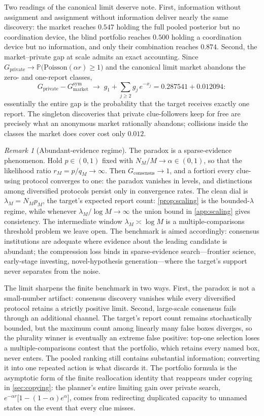 \documentclass[11pt]{article}
\theoremstyle{definition}
\theoremstyle{remark}
\newtheorem{remark}{Remark}
\newcommand{\Prob}{\mathbb{P}}
\newcommand{\1}{\mathbf{1}}
\newcommand{\priv}{\mathrm{private}}
\newcommand{\cons}{\mathrm{consensus}}
\newcommand{\mkt}{\mathrm{market}}
\begin{document}
Two readings of the canonical limit deserve note. First, information without assignment and assignment without information deliver nearly the same discovery: the market reaches $0.547$ holding the full pooled posterior but no coordination device, the blind portfolio reaches $0.500$ holding a coordination device but no information, and only their combination reaches $0.874$. Second, the market--private gap at scale admits an exact accounting. Since $G_{\priv}\to\Prob\bigl(\mathrm{Poisson}(\alpha r)\ge1\bigr)$ and the canonical limit market abandons the zero- and one-report classes,
\[
G_{\priv}-G_{\mkt}^{\mathrm{sym}}
\;\longrightarrow\;
g_1+\sum_{j\ge2}g_j\,e^{-x_j}
=0.287541+0.012094:
\]
essentially the entire gap is the probability that the target receives exactly one report. The singleton discoveries that private clue-followers keep for free are precisely what an anonymous market rationally abandons; collisions inside the classes the market does cover cost only $0.012$.

\begin{remark}[Abundant-evidence regime]
\label{rem:abundant}
The paradox is a sparse-evidence phenomenon. Hold $p\in(0,1)$ fixed with $N_M/M\to\alpha\in(0,1)$, so that the likelihood ratio $r_M=p/q_M\to\infty$. Then $G_{\cons}\to1$, and a fortiori every clue-using protocol converges to one: the paradox vanishes in levels, and distinctions among diversified protocols persist only in convergence rates. The clean dial is $\lambda_M=N_Mp_M$, the target's expected report count: \cref{prop:scaling} is the bounded-$\lambda$ regime, while whenever $\lambda_M/\log M\to\infty$ the union bound in \cref{app:scaling} gives consistency. The intermediate window $\lambda_M\asymp\log M$ is a multiple-comparisons threshold problem we leave open. The benchmark is aimed accordingly: consensus institutions are adequate where evidence about the leading candidate is abundant; the compression loss binds in sparse-evidence search---frontier science, early-stage investing, novel-hypothesis generation---where the target's support never separates from the noise.
\end{remark}

The limit sharpens the finite benchmark in two ways. First, the paradox is not a small-number artifact: consensus discovery vanishes while every diversified protocol retains a strictly positive limit. Second, large-scale consensus fails through an additional channel. The target's report count remains stochastically bounded, but the maximum count among linearly many false boxes diverges, so the plurality winner is eventually an extreme false positive: top-one selection loses a multiple-comparisons contest that the portfolio, which retains every named box, never enters. The pooled ranking still contains substantial information; converting it into one repeated action is what discards it. The portfolio formula is the asymptotic form of the finite reallocation identity that reappears under copying in \cref{sec:copying}: the planner's entire limiting gain over private search, $e^{-\alpha r}\bigl[1-(1-\alpha)e^{\alpha}\bigr]$, comes from redirecting duplicated capacity to unnamed states on the event that every clue misses.
\end{document}

